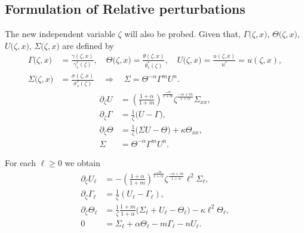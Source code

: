 \documentclass[a4paper,11pt]{article}
\def\l{{\ell}}
\theoremstyle{remark}
\begin{document}
{\subsection{Formulation of Relative perturbations}
The new independent variable $\zeta$ will also be probed. Given that, $\Gamma\big(\zeta,x\big)$, $\Theta\big(\zeta,x\big)$, $U\big(\zeta,x\big)$, $\Sigma\big(\zeta,x\big)$ are defined by \begin{equation*}
 \begin{aligned}
  \Gamma\big(\zeta,x\big)&=\frac{\gamma(\zeta,x)}{\gamma^*_s(\zeta)}, \quad \Theta\big(\zeta,x\big)=\frac{\theta(\zeta,x)}{\theta^*_s(\zeta)}, \quad U\big(\zeta,x\big)=\frac{u(\zeta,x)}{u^*}=u(\zeta,x),\\
  \Sigma\big(\zeta,x\big)&=\frac{\sigma(\zeta,x)}{\sigma^*_s(\zeta)} \quad \Longrightarrow \quad \Sigma = \Theta^{-\alpha}\Gamma^m U^n.
 \end{aligned}
\end{equation*}
\begin{equation}
 \begin{aligned}
  \partial_\zeta U &= \left( \frac{1+\alpha}{1+m}\right)^{\frac{-\alpha}{1+\alpha}}\zeta^{\frac{-\alpha+m}{1+\alpha}} \Sigma_{xx},\\
  \partial_\zeta \Gamma &= \frac{1}{\zeta} \Big(U-\Gamma\Big),\\
  \partial_\zeta \Theta &= \frac{1}{\zeta}\Big(\Sigma U - \Theta\Big) + \kappa\Theta_{xx}, \\
  \Sigma&=\Theta^{-\alpha}\Gamma^m U^n.
 \end{aligned}
\end{equation}

For each $\ell\ge0$ we obtain
\begin{equation} \label{eq:l-system_heat}
 \begin{aligned}
  \partial_\zeta U_\ell &= -\left(\frac{1+\alpha}{1+m}\right)^{\frac{-\alpha}{1+\alpha}}\zeta^{\frac{-\alpha+m}{1+\alpha}}\l^2 \Sigma_\ell,\\
  \partial_\zeta\Gamma_\ell &= \frac{1}{\zeta}(U_\ell-\Gamma_\ell),\\
  \partial_\zeta\Theta_\ell &= \frac{1}{\zeta}\frac{1+m}{1+\alpha}\Big(\Sigma_\ell+ U_\ell -\Theta_\ell\Big) - \kappa\l^2\Theta_\ell,\\
  0&=\Sigma_\ell + \alpha\Theta_\ell -m\Gamma_\ell - nU_\ell .
 \end{aligned}
\end{equation}


}
\end{document}
